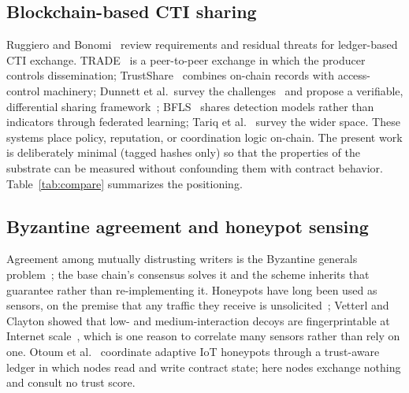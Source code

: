 \documentclass[conference]{IEEEtran}
\begin{document}
\subsection{Blockchain-based CTI sharing}
Ruggiero and Bonomi~\cite{ref4} review requirements and residual threats for ledger-based CTI exchange. TRADE~\cite{ref5} is a peer-to-peer exchange in which the producer controls dissemination; TrustShare~\cite{ref6} combines on-chain records with access-control machinery; Dunnett et al.\ survey the challenges~\cite{ref11} and propose a verifiable, differential sharing framework~\cite{ref7}; BFLS~\cite{ref9} shares detection models rather than indicators through federated learning; Tariq et al.~\cite{ref12} survey the wider space. These systems place policy, reputation, or coordination logic on-chain. The present work is deliberately minimal (tagged hashes only) so that the properties of the substrate can be measured without confounding them with contract behavior. Table~\ref{tab:compare} summarizes the positioning.

\subsection{Byzantine agreement and honeypot sensing}
Agreement among mutually distrusting writers is the Byzantine generals problem~\cite{ref13}; the base chain's consensus solves it and the scheme inherits that guarantee rather than re-implementing it. Honeypots have long been used as sensors, on the premise that any traffic they receive is unsolicited~\cite{ref14,ref15}; Vetterl and Clayton showed that low- and medium-interaction decoys are fingerprintable at Internet scale~\cite{ref16}, which is one reason to correlate many sensors rather than rely on one. Otoum et al.~\cite{ref10} coordinate adaptive IoT honeypots through a trust-aware ledger in which nodes read and write contract state; here nodes exchange nothing and consult no trust score.
\end{document}
